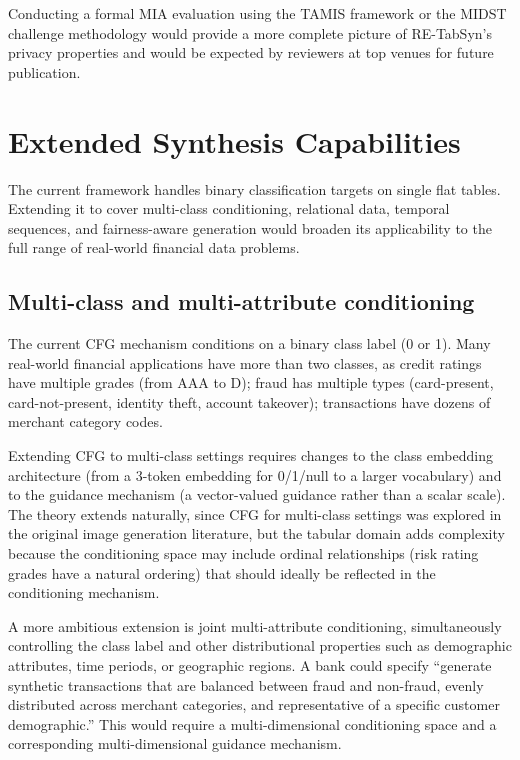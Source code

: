 Conducting a formal MIA evaluation using the TAMIS framework \cite{meeus2024tamis} or the MIDST challenge methodology \cite{meeus2024midst} would provide a more complete picture of RE-TabSyn's privacy properties and would be expected by reviewers at top venues for future publication.

\section{Extended Synthesis Capabilities}

The current framework handles binary classification targets on single flat tables. Extending it to cover multi-class conditioning, relational data, temporal sequences, and fairness-aware generation would broaden its applicability to the full range of real-world financial data problems.

\subsection{Multi-class and multi-attribute conditioning}

The current CFG mechanism conditions on a binary class label (0 or 1). Many real-world financial applications have more than two classes, as credit ratings have multiple grades (from AAA to D); fraud has multiple types (card-present, card-not-present, identity theft, account takeover); transactions have dozens of merchant category codes.

Extending CFG to multi-class settings requires changes to the class embedding architecture (from a 3-token embedding for 0/1/null to a larger vocabulary) and to the guidance mechanism (a vector-valued guidance rather than a scalar scale). The theory extends naturally, since CFG for multi-class settings was explored in the original image generation literature, but the tabular domain adds complexity because the conditioning space may include ordinal relationships (risk rating grades have a natural ordering) that should ideally be reflected in the conditioning mechanism.

A more ambitious extension is joint multi-attribute conditioning, simultaneously controlling the class label and other distributional properties such as demographic attributes, time periods, or geographic regions. A bank could specify ``generate synthetic transactions that are balanced between fraud and non-fraud, evenly distributed across merchant categories, and representative of a specific customer demographic.'' This would require a multi-dimensional conditioning space and a corresponding multi-dimensional guidance mechanism.

